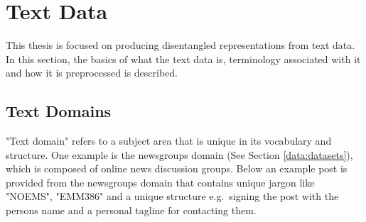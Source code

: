 















\section{Text Data}\label{textdatach2}

This thesis is focused on producing disentangled representations from text data. In this section, the basics of what the text data is, terminology associated with it and how it is preprocessed is described.

\subsection{Text Domains}

"Text domain" refers to a subject area that is unique in its vocabulary and structure. One example is the newsgroups domain (See Section \ref{data:datasets}), which is composed of online news discussion groups. Below an example post is provided from the newsgroups domain that contains unique jargon like "NOEMS", "EMM386" and a unique structure e.g.\ signing the post with the persons name and a personal tagline for contacting them. %




